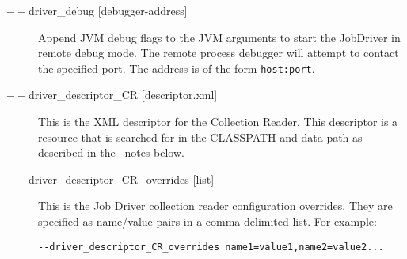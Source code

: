 \begin{description}
           \item[$--$driver\_debug {[debugger-address]}] Append JVM debug flags to the JVM arguments
             to start the JobDriver in remote debug mode.  The remote process debugger will attempt
             to contact the specified port. The address is of the form {\tt host:port}.

           \item[$--$driver\_descriptor\_CR {[descriptor.xml]} ] This is the XML descriptor for the
             Collection Reader.  This descriptor is a resource that is searched for in the CLASSPATH
             and data path as described in the ~\hyperref[par:cli.submit.notes]{notes below}.

           \item[$--$driver\_descriptor\_CR\_overrides {[list]} ]             
             This is the Job Driver collection reader configuration overrides. They are specified as 
             name/value pairs in a comma-delimited list. For example: 
             \begin{verbatim}
--driver_descriptor_CR_overrides name1=value1,name2=value2...
             \end{verbatim}
             
             
%
%             



\end{description}
